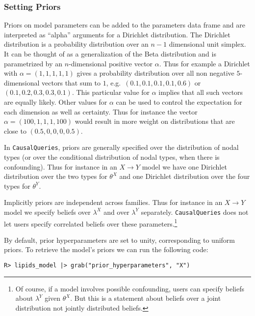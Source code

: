 \documentclass[
  11pt,
  article]{jss}
\begin{document}
\hypertarget{priors}{%
\subsubsection{Setting Priors}\label{priors}}

Priors on model parameters can be added to the parameters data frame and
are interpreted as ``alpha'' arguments for a Dirichlet distribution. The
Dirichlet distribution is a probability distribution over an \(n-1\)
dimensional unit simplex. It can be thought of as a generalization of
the Beta distribution and is parametrized by an \(n\)-dimensional
positive vector \(\alpha\). Thus for example a Dirichlet with
\(\alpha = (1, 1, 1, 1, 1)\) gives a probability distribution over all
non negative \(5\)-dimensional vectors that sum to \(1\),
e.g.~\((0.1, 0.1, 0.1, 0.1, 0.6)\) or \((0.1, 0.2, 0.3, 0.3, 0.1)\).
This particular value for \(\alpha\) implies that all such vectors are
equally likely. Other values for \(\alpha\) can be used to control the
expectation for each dimension as well as certainty. Thus for instance
the vector \(\alpha = (100, 1, 1, 1, 100)\) would result in more weight
on distributions that are close to \((0.5, 0, 0, 0, 0.5)\).

In \texttt{CausalQueries}, priors are generally specified over the
distribution of nodal types (or over the conditional distribution of
nodal types, when there is confounding). Thus for instance in an
\(X \rightarrow Y\) model we have one Dirichlet distribution over the
two types for \(\theta^X\) and one Dirichlet distribution over the four
types for \(\theta^Y\).

Implicitly priors are independent across families. Thus for instance in
an \(X \rightarrow Y\) model we specify beliefs over \(\lambda^X\) and
over \(\lambda^Y\) separately. \texttt{CausalQueries} does not let users
specify correlated beliefs over these parameters.\footnote{Of course, if
  a model involves possible confounding, users can specify beliefs about
  \(\lambda^Y\) given \(\theta^X\). But this is a statement about
  beliefs over a joint distribution not jointly distributed beliefs.}

By default, prior hyperparameters are set to unity, corresponding to
uniform priors. To retrieve the model's priors we can run the following
code:

\begin{verbatim}
R> lipids_model |> grab("prior_hyperparameters", "X") 
\end{verbatim}
\end{document}
